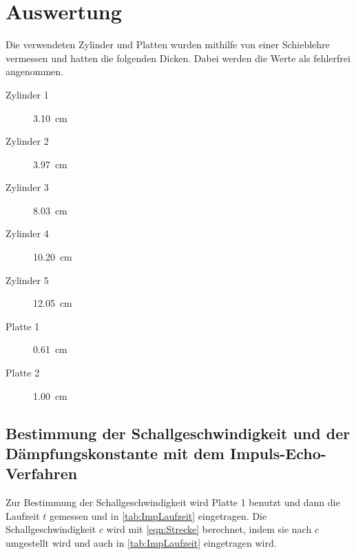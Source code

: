 \section{Auswertung}
\label{sec:Auswertung}

Die verwendeten Zylinder und Platten wurden mithilfe von einer Schieblehre vermessen und hatten die folgenden Dicken.
Dabei werden die Werte als fehlerfrei angenommen.
\begin{description}
  \item[Zylinder 1] \SI{3,10}{\centi\meter}
  \item[Zylinder 2] \SI{3,97}{\centi\meter}
  \item[Zylinder 3] \SI{8.03}{\centi\meter}
  \item[Zylinder 4] \SI{10.20}{\centi\meter}
  \item[Zylinder 5] \SI{12.05}{\centi\meter}
  \item[Platte 1] \SI{0.61}{\centi\meter}
  \item[Platte 2] \SI{1.00}{\centi\meter}
\end{description}

\subsection{Bestimmung der Schallgeschwindigkeit und der Dämpfungskonstante mit dem Impuls-Echo-Verfahren}
\label{sub:ImpEch}
Zur Bestimmung der Schallgeschwindigkeit wird Platte 1 benutzt und dann die Laufzeit $t$ gemessen und in \autoref{tab:ImpLaufzeit} eingetragen.
Die Schallgeschwindigkeit $c$ wird mit \autoref{eqn:Strecke} berechnet, indem sie nach $c$ umgestellt wird und auch in \autoref{tab:ImpLaufzeit} 
eingetragen wird.

